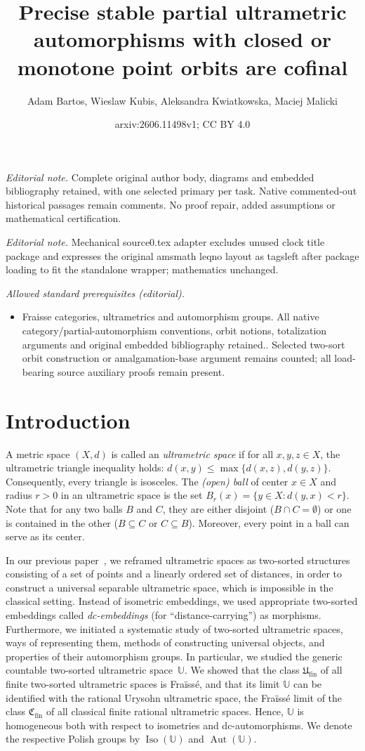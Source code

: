 \documentclass[10pt,a4paper]{article}
\title{Precise stable partial ultrametric automorphisms with closed or monotone point orbits are cofinal}
\author{Adam Bartos, Wieslaw Kubis, Aleksandra Kwiatkowska, Maciej Malicki}
\date{arxiv:2606.11498v1; CC BY 4.0}
\theoremstyle{definition}
\theoremstyle{remark}
\newcommand \U {\mathbb{U}}
\newcommand \fin {{\operatorname{fin}}}
\newcommand \Ult {\mathfrak{U}}
\newcommand \Aut {\operatorname{Aut}}
\newcommand \Iso {\operatorname{Iso}}
\begin{document}
\maketitle
\noindent\textit{Editorial note.} Complete original author body, diagrams and embedded bibliography retained, with one selected primary per task. Native commented-out historical passages remain comments. No proof repair, added assumptions or mathematical certification.\par\medskip
\noindent\textit{Editorial note.} Mechanical source0.tex adapter excludes unused clock title package and expresses the original amsmath leqno layout as tagsleft after package loading to fit the standalone wrapper; mathematics unchanged.\par\medskip
\noindent\textit{Allowed standard prerequisites (editorial).}\begin{itemize}
\item Fraisse categories, ultrametrics and automorphism groups. All native category/partial-automorphism conventions, orbit notions, totalization arguments and original embedded bibliography retained.. Selected two-sort orbit construction or amalgamation-base argument remains counted; all load-bearing source auxiliary proofs remain present.
\end{itemize}\medskip
\section{Introduction}

A metric space $(X,d)$ is called an {\em ultrametric space} if for all $x,y,z\in X$, the ultrametric triangle inequality holds: $d(x,y)\leq\max\{d(x,z), d(y,z)\}$. 
Consequently, every triangle is isosceles.
The {\em (open) ball} of center $x\in X$ and radius $r>0$ in an ultrametric space is the set $B_r(x)=\{y\in X\colon d(y,x)<r\}$.
Note that for any two balls $B$ and $C$, they are either disjoint ($B\cap C=\emptyset$) or one is contained in the other ($B\subseteq C$ or $C\subseteq B$). Moreover, every point in a ball can serve as its center.

In our previous paper~\cite{paper1}, we reframed ultrametric spaces as two-sorted structures consisting of a set of points and a linearly ordered set of distances, in order to construct a universal separable ultrametric space, which is impossible in the classical setting.
Instead of isometric embeddings, we used appropriate two-sorted embeddings called \emph{dc-embeddings} (for “distance-carrying”) as morphisms.
Furthermore, we initiated a systematic study of two-sorted ultrametric spaces, ways of representing them, methods of constructing universal objects, and properties of their automorphism groups.
In particular, we studied the generic countable two-sorted ultrametric space~$\U$.
We showed that the class $\Ult_\fin$ of all finite two-sorted ultrametric spaces is Fraïssé, and that its limit $\U$ can be identified with the rational Urysohn ultrametric space, the Fraïssé limit of the class $\mathfrak{C}_\fin$ of all classical finite rational ultrametric spaces.
Hence, $\U$ is homogeneous both with respect to isometries and dc-automorphisms.
We denote the respective Polish groups by $\Iso(\U)$ and $\Aut(\U)$.
\end{document}
